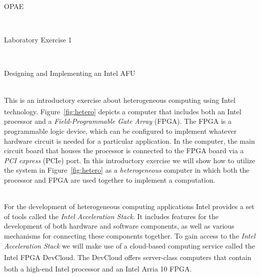 \documentclass[epsfig,10pt,fullpage]{article}
\newcommand{\LabNum}{1}
\begin{document}
\centerline{\huge OPAE}
~\\
\centerline{\huge Laboratory Exercise \LabNum}
~\\
\centerline{\large Designing and Implementing an Intel AFU}
~\\

\noindent
This is an introductory exercise about heterogeneous computing using Intel technology.
Figure~\ref{fig:hetero} depicts a computer that includes both an 
Intel\textsuperscript{\textregistered} processor and a {\it Field-Programmable Gate Array}
(FPGA). The FPGA is a programmable logic device, which can be configured to implement
whatever hardware circuit is needed for a particular application.  
In the computer, the main circuit board that
houses the processor is connected to the FPGA board via a {\it PCI express} (PCIe) port.
In this introductory exercise we will show how to utilize the system in 
Figure~\ref{fig:hetero} as a {\it heterogeneous} 
computer in which both the processor and FPGA are used together to implement a computation.

~\\
\noindent
For the development of heterogeneous computing applications Intel
provides a set of tools called the {\it Intel Acceleration Stack}. It includes 
features for the development of both hardware and software components, as well as various 
mechanisms for connecting these components together. 
To gain access to the {\it Intel Acceleration Stack} we will make use of a cloud-based 
computing service called the Intel FPGA DevCloud\textsuperscript{\textregistered}.
The DevCloud offers server-class computers that contain both a high-end Intel processor
and an Intel Arria\textsuperscript{\textregistered} 10 FPGA.
\end{document}
